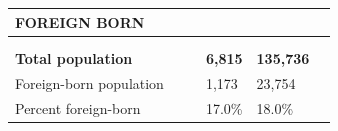 \documentclass[9pt]{report}
\begin{document}
\newpage
\setlength{\tabcolsep}{.01in} %
\begin{tabular}{p{.10in}p{.10in}p{.10in}p{3.7in}>{\hfill}p{.85in}>{\hfill}p{.85in}>{\hfill}p{.85in}>{\hfill}p{.85in}p{0.1in}}
\multicolumn{9}{l}{\parbox{7.1in}{\raggedright{\large{\strut\textbf{FOREIGN BORN}\strut}}}} \\ 
\hline
\multicolumn{4}{l}{\parbox{3.5in}{\raggedright{\textbf{}}}} & \multicolumn{1}{r}{\parbox{.85in}{\strut\raggedleft{\textbf{}\strut}}} & \multicolumn{1}{r}{\parbox{.85in}{\strut\raggedleft{\textbf{}\strut}}} & \multicolumn{1}{r}{\parbox{.85in}{\strut{}}} & \multicolumn{1}{r}{\parbox{.85in}{\strut{}}} & \\ 
\multicolumn{9}{l}{} \\ 
\multicolumn{4}{l}{\parbox{3.5in}{\strut\raggedright{\textbf{Total population}\strut}}} & \textbf{} & \textbf{} & \textbf{6,815} & \textbf{135,736} & \textbf{} \\ 
\multicolumn{4}{l}{\parbox{3.6in}{\strut\raggedright{{Foreign-born population}}\strut}} &  &  & 1,173 & 23,754 & \multicolumn{1}{l}{}  \\ 
\multicolumn{4}{l}{\parbox{3.6in}{\strut\raggedright{{Percent foreign-born}}\strut}} &  &  & 17.0\% & 18.0\% & \multicolumn{1}{l}{}  \\ 

\end{tabular}
\setlength{\tabcolsep}{6pt} %
\end{document}
